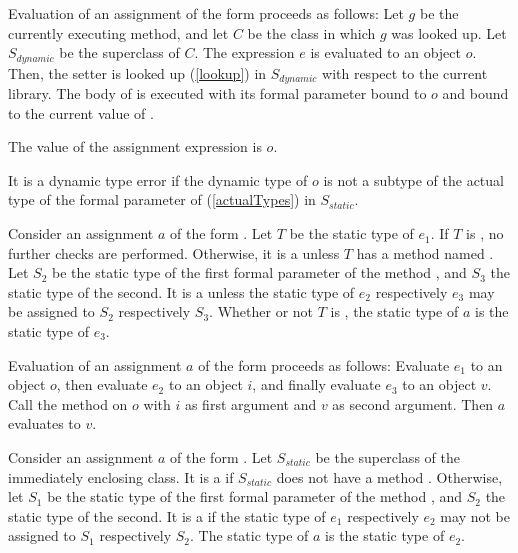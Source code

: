 \documentclass[makeidx]{article}
\begin{document}
\LMHash{}%
Evaluation of an assignment of the form 
proceeds as follows:
Let $g$ be the currently executing method, and let $C$ be
the class in which $g$ was looked up.
Let $S_{dynamic}$ be the superclass of $C$.
The expression $e$ is evaluated to an object $o$.
Then, the setter  is looked up (\ref{lookup})
in $S_{dynamic}$ with respect to the current library.
The body of  is executed with its formal parameter bound to $o$
and \THIS{} bound to the current value of \THIS.


\LMHash{}%
The value of the assignment expression is $o$.

\LMHash{}%
It is a dynamic type error if the dynamic type of $o$ is not
a subtype of the actual type of the formal parameter of 
(\ref{actualTypes}) in $S_{static}$.
\EndCase

\LMHash{}%
Consider an assignment $a$ of the form .
Let $T$ be the static type of $e_1$.
If $T$ is \DYNAMIC, no further checks are performed.
Otherwise, it is a  unless
$T$ has a method named \code{[]=}.
Let $S_2$ be the static type of the
first formal parameter of the method \code{[]=},
and $S_3$ the static type of the second.
It is a
 unless the static type of $e_2$ respectively $e_3$
may be assigned to $S_2$ respectively $S_3$.
Whether or not $T$ is \DYNAMIC,
the static type of $a$ is the static type of $e_3$.

\LMHash{}%
Evaluation of an assignment $a$ of the form 
proceeds as follows:
Evaluate $e_1$ to an object $o$,
then evaluate $e_2$ to an object $i$,
and finally evaluate $e_3$ to an object $v$.
Call the method \code{[]=} on $o$
with $i$ as first argument and $v$ as second argument.
Then $a$ evaluates to $v$.
\EndCase

\LMHash{}%
Consider an assignment $a$ of the form .
Let $S_{static}$ be the superclass of the immediately enclosing class.
It is a
 if $S_{static}$ does not have a method \code{[]=}.
Otherwise, let $S_1$ be the static type of the
first formal parameter of the method \code{[]=},
and $S_2$ the static type of the second.
It is a
 if the static type of $e_1$ respectively $e_2$
may not be assigned to $S_1$ respectively $S_2$.
The static type of $a$ is the static type of $e_2$.
\end{document}
